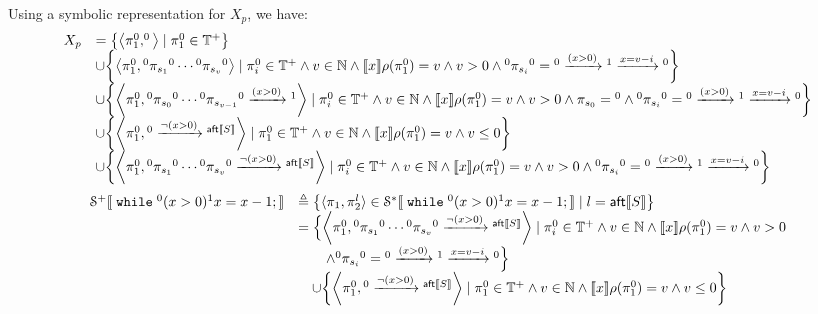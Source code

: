 \begin{example}
\[ \]
 Using a symbolic representation for $X_p$, we have:
 \[
 \begin{array}{ll}
 X_p &=  \left\{ \left< \pi_1^0, ^0\right> \mid \pi_1^0 \in \mathbb{T^{+}} \right\}
 \\ &  \cup 
 \left\{ \left< \pi_1^0, {}^0 \pi_{s_1} {}^0 \cdots {}^0 \pi_{s_v} {}^0\right>
 \mid \pi_i^0 \in \mathbb{T^{+}} \land v \in \mathbb{N} \land
 \sem{x}\env(\pi_1^0) = v
 \land v > 0  \land
 {}^0 \pi_{s_i} {}^0 = {}^0 \xrightarrow{(x > 0)} {}^1 \xrightarrow{x = v - i} {}^0\right\}
 \\ &  \cup 
 \left\{ \left< \pi_1^0, {}^0 \pi_{s_0} {}^0 \cdots {}^0 \pi_{s_{v - 1}} {}^0 \xrightarrow{(x > 0)} {}^1 \right>
 \mid \pi_i^0 \in \mathbb{T^{+}} \land v \in \mathbb{N} \land
 \sem{x}\env(\pi_1^0) = v
 \land v > 0 \land 
 \pi_{s_0} = {}^0  \land
 {}^0 \pi_{s_i} {}^0 = {}^0 \xrightarrow{(x > 0)} {}^1 \xrightarrow{x = v - i} {}^0\right\}
 \\ & \cup 
 \left\{ \left< \pi_1^0, {}^0 \xrightarrow{\neg(x > 0)} {}^{\mathsf{aft}\sem{S}} \right> 
 \mid \pi_1^0 \in \mathbb{T^{+}} \land v \in \mathbb{N} \land
  \sem{x}\env(\pi_1^0) = v
 \land v \leq 0 \right\}
\\ & \cup 
 \left\{ \left< \pi_1^0, {}^0 \pi_{s_1} {}^0 \cdots {}^0 \pi_{s_v} {}^0 \xrightarrow{\neg(x > 0)} {}^{\mathsf{aft}\sem{S}}\right>
 \mid \pi_i^0 \in \mathbb{T^{+}} \land v \in \mathbb{N} \land
 \sem{x}\env(\pi_1^0) = v
 \land v > 0  \land
 {}^0 \pi_{s_i} {}^0 = {}^0 \xrightarrow{(x > 0)} {}^1 \xrightarrow{x = v - i} {}^0
 \right\}
 \end{array}
 \]
 \[
 \begin{array}{ll}
  \mathcal{S}^{+}\sem{\ewhile {}^0 (x > 0) {}^1 x = x - 1;} 
  & \triangleq \left\{ \config{\pi_1, \pi_2^{l}} \in \mathcal{S}^{*}\sem{\ewhile {}^0 (x > 0) {}^1 x = x - 1;} \mid l = \mathsf{aft}\sem{S}
  \right\}\\
  & = \Big\{ \left< \pi_1^0, {}^0 \pi_{s_1} {}^0 \cdots {}^0 \pi_{s_v} {}^0 \xrightarrow{\neg(x > 0)} {}^{\mathsf{aft}\sem{S}}\right>
 \mid \pi_i^0 \in \mathbb{T^{+}} \land v \in \mathbb{N} \land
 \sem{x}\env(\pi_1^0) = v
 \land v > 0  
 \\ & \qquad \land
 {}^0 \pi_{s_i} {}^0 = {}^0 \xrightarrow{(x > 0)} {}^1 \xrightarrow{x = v - i} {}^0
 \Big\}
  \\ & \quad \cup 
 \left\{ \left< \pi_1^0, {}^0 \xrightarrow{\neg(x > 0)} {}^{\mathsf{aft}\sem{S}} \right> 
 \mid \pi_1^0 \in \mathbb{T^{+}} \land v \in \mathbb{N} \land
  \sem{x}\env(\pi_1^0) = v
 \land v \leq 0 \right\}
\end{array}
\]
\end{example}
